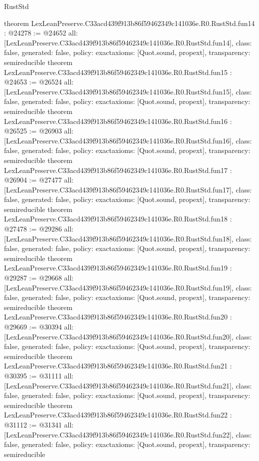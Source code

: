\begin{lexlean}{RustStd}
\begin{coremodule}
{}
theorem LexLeanPreserve.C33acd439f913b86f59462349c141036e.R0.RustStd.fun14 : @24278 := @24652 {
  all: [LexLeanPreserve.C33acd439f913b86f59462349c141036e.R0.RustStd.fun14],
  class: false,
  generated: false,
  policy: exact{axioms: [Quot.sound, propext]},
  transparency: semireducible
}
theorem LexLeanPreserve.C33acd439f913b86f59462349c141036e.R0.RustStd.fun15 : @24653 := @26524 {
  all: [LexLeanPreserve.C33acd439f913b86f59462349c141036e.R0.RustStd.fun15],
  class: false,
  generated: false,
  policy: exact{axioms: [Quot.sound, propext]},
  transparency: semireducible
}
theorem LexLeanPreserve.C33acd439f913b86f59462349c141036e.R0.RustStd.fun16 : @26525 := @26903 {
  all: [LexLeanPreserve.C33acd439f913b86f59462349c141036e.R0.RustStd.fun16],
  class: false,
  generated: false,
  policy: exact{axioms: [Quot.sound, propext]},
  transparency: semireducible
}
theorem LexLeanPreserve.C33acd439f913b86f59462349c141036e.R0.RustStd.fun17 : @26904 := @27477 {
  all: [LexLeanPreserve.C33acd439f913b86f59462349c141036e.R0.RustStd.fun17],
  class: false,
  generated: false,
  policy: exact{axioms: [Quot.sound, propext]},
  transparency: semireducible
}
theorem LexLeanPreserve.C33acd439f913b86f59462349c141036e.R0.RustStd.fun18 : @27478 := @29286 {
  all: [LexLeanPreserve.C33acd439f913b86f59462349c141036e.R0.RustStd.fun18],
  class: false,
  generated: false,
  policy: exact{axioms: [Quot.sound, propext]},
  transparency: semireducible
}
theorem LexLeanPreserve.C33acd439f913b86f59462349c141036e.R0.RustStd.fun19 : @29287 := @29668 {
  all: [LexLeanPreserve.C33acd439f913b86f59462349c141036e.R0.RustStd.fun19],
  class: false,
  generated: false,
  policy: exact{axioms: [Quot.sound, propext]},
  transparency: semireducible
}
theorem LexLeanPreserve.C33acd439f913b86f59462349c141036e.R0.RustStd.fun20 : @29669 := @30394 {
  all: [LexLeanPreserve.C33acd439f913b86f59462349c141036e.R0.RustStd.fun20],
  class: false,
  generated: false,
  policy: exact{axioms: [Quot.sound, propext]},
  transparency: semireducible
}
theorem LexLeanPreserve.C33acd439f913b86f59462349c141036e.R0.RustStd.fun21 : @30395 := @31111 {
  all: [LexLeanPreserve.C33acd439f913b86f59462349c141036e.R0.RustStd.fun21],
  class: false,
  generated: false,
  policy: exact{axioms: [Quot.sound, propext]},
  transparency: semireducible
}
theorem LexLeanPreserve.C33acd439f913b86f59462349c141036e.R0.RustStd.fun22 : @31112 := @31341 {
  all: [LexLeanPreserve.C33acd439f913b86f59462349c141036e.R0.RustStd.fun22],
  class: false,
  generated: false,
  policy: exact{axioms: [Quot.sound, propext]},
  transparency: semireducible
}
\end{coremodule}
\end{lexlean}
